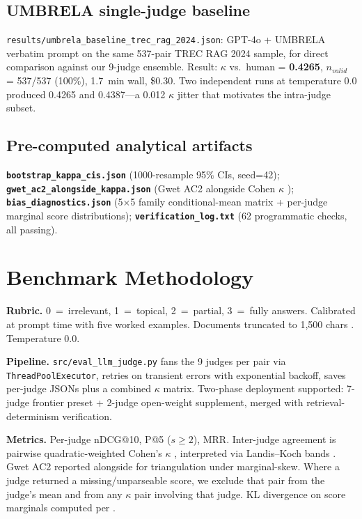 \documentclass{article}
\begin{document}
\subsection{UMBRELA single-judge baseline}

\texttt{results/umbrela\_baseline\_trec\_rag\_2024.json}: GPT-4o + UMBRELA verbatim prompt \citep{upadhyay2024umbrela} on the same 537-pair TREC RAG 2024 sample, for direct comparison against our 9-judge ensemble. Result: $\kappa$ vs.\ human = \textbf{0.4265}, $n_{valid}$ = 537/537 (100\%), 1.7~min wall, \$0.30. Two independent runs at temperature 0.0 produced 0.4265 and 0.4387---a 0.012 $\kappa$ jitter that motivates the intra-judge subset.

\subsection{Pre-computed analytical artifacts}

\textbf{\texttt{bootstrap\_kappa\_cis.json}} (1000-resample 95\% CIs, seed=42); \textbf{\texttt{gwet\_ac2\_alongside\_kappa.json}} (Gwet AC2 alongside Cohen $\kappa$ \citep{gwet2008}); \textbf{\texttt{bias\_diagnostics.json}} (5$\times$5 family conditional-mean matrix + per-judge marginal score distributions); \textbf{\texttt{verification\_log.txt}} (62 programmatic checks, all passing).

\section{Benchmark Methodology}

\textbf{Rubric.} 0~=~irrelevant, 1~=~topical, 2~=~partial, 3~=~fully answers. Calibrated at prompt time with five worked examples. Documents truncated to 1{,}500 chars \citep{saito2023verbosity}. Temperature 0.0.

\textbf{Pipeline.} \texttt{src/eval\_llm\_judge.py} fans the 9 judges per pair via \texttt{ThreadPoolExecutor}, retries on transient errors with exponential backoff, saves per-judge JSONs plus a combined $\kappa$ matrix. Two-phase deployment supported: 7-judge frontier preset + 2-judge open-weight supplement, merged with retrieval-determinism verification.

\textbf{Metrics.} Per-judge nDCG@10, P@5 ($s \geq 2$), MRR. Inter-judge agreement is pairwise quadratic-weighted Cohen's $\kappa$ \citep{thakur2024judges,cohen1968,fleiss1971}, interpreted via Landis--Koch bands \citep{landis1977}. Gwet AC2 reported alongside for triangulation under marginal-skew. Where a judge returned a missing/unparseable score, we exclude that pair from the judge's mean and from any $\kappa$ pair involving that judge. KL divergence on score marginals computed per \citet{kullback1951}.
\end{document}
